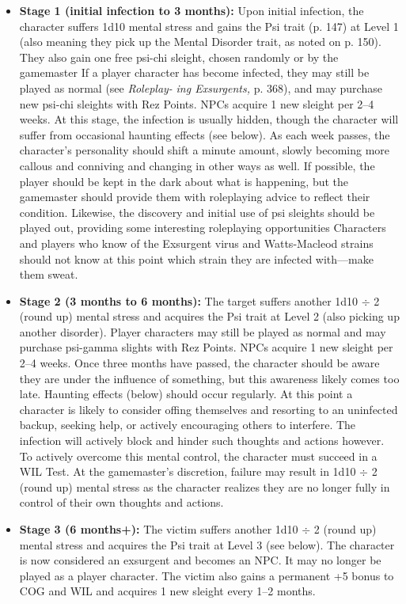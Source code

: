 \begin{itemize}
\item \textbf{Stage 1 (initial infection to 3 months):} Upon initial
infection, the character suffers 1d10 mental
stress and gains the Psi trait (p. 147) at Level 1 
(also meaning they pick up the Mental Disorder 
trait, as noted on p. 150). They also gain one free 
psi-chi sleight, chosen randomly or by the gamemaster
If a player character has become infected,
they may still be played as normal (see \textit{Roleplay-}
\textit{ing Exsurgents,} p. 368), and may purchase new 
psi-chi sleights with Rez Points. NPCs acquire 1 
new sleight per 2–4 weeks.
  At this stage, the infection is usually hidden, 
though the character will suffer from occasional 
haunting effects (see below). As each week passes, 
the character's personality should shift a minute 
amount, slowly becoming more callous and conniving
and changing in other ways as well. If
possible, the player should be kept in the dark 
about what is happening, but the gamemaster 
should provide them with roleplaying advice to 
reflect their condition. Likewise, the discovery 
and initial use of psi sleights should be played 
out, providing some interesting roleplaying opportunities
Characters and players who know of
the Exsurgent virus and Watts-Macleod strains 
should not know at this point which strain they 
are infected with—make them sweat.
\item \textbf{Stage 2 (3 months to 6 months):} The target suffers
another 1d10 $\div$ 2 (round up) mental stress
and acquires the Psi trait at Level 2 (also picking
up another disorder). Player characters may
still be played as normal and may purchase psi-gamma
slights with Rez Points. NPCs acquire 1
new sleight per 2–4 weeks.
  Once three months have passed, the character 
should be aware they are under the influence 
of something, but this awareness likely comes 
too late. Haunting effects (below) should occur 
regularly. At this point a character is likely to 
consider offing themselves and resorting to an 
uninfected backup, seeking help, or actively encouraging
others to interfere. The infection will
actively block and hinder such thoughts and actions
however. To actively overcome this mental
control, the character must succeed in a WIL Test. 
At the gamemaster's discretion, failure may result 
in 1d10 $\div$ 2 (round up) mental stress as the character
realizes they are no longer fully in control
of their own thoughts and actions. 
\item  \textbf{Stage 3 (6 months+):} The victim suffers another 
1d10 $\div$ 2 (round up) mental stress and acquires 
the Psi trait at Level 3 (see below). The character 
is now considered an exsurgent and becomes 
an NPC. It may no longer be played as a player 
character. The victim also gains a permanent 
+5 bonus to COG and WIL and acquires 1 new 
sleight every 1–2 months.
\end{itemize}

